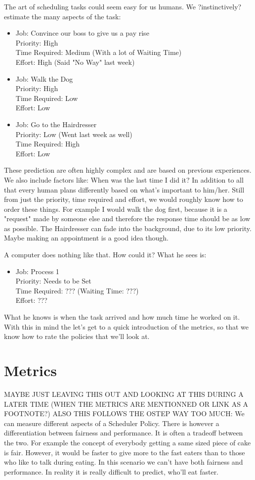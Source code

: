 \documentclass{report}
\begin{document}
The art of scheduling tasks could seem easy for us humans.
We ?instinctively? estimate the many aspects of the task:
\begin{itemize}
\item Job: Convince our boss to give us a pay rise\\Priority: High\\Time Required: Medium (With a lot of Waiting Time)\\Effort: High (Said "No Way" last week)
\item Job: Walk the Dog\\Priority: High\\Time Required: Low\\Effort: Low
\item Job: Go to the Hairdresser\\ Priority: Low (Went last week as well)\\Time Required: High\\Effort: Low
\end{itemize}
These prediction are often highly complex and are based on previous experiences.
We also include factors like: When was the last time I did it?
In addition to all that every human plans differently based on what's important to him/her.
Still from just the priority, time required and effort, we would roughly know how to order these things.
For example I would walk the dog first, because it is a "request" made by someone else and therefore the response time should be as low as possible.
The Hairdresser can fade into the background, due to its low priority. Maybe making an appointment is a good idea though.

A computer does nothing like that. How could it? What he sees is:
\begin{itemize}
\item Job: Process 1\\Priority: Needs to be Set\\Time Required: ??? (Waiting Time: ???)\\Effort: ???
\end{itemize}
What he knows is when the task arrived and how much time he worked on it.
With this in mind the let's get to a quick introduction of the metrics, so that we know how to rate the policies that we'll look at.



\section{Metrics}
MAYBE JUST LEAVING THIS OUT AND LOOKING AT THIS DURING A LATER TIME (WHEN THE METRICS ARE MENTIONNED OR LINK AS A FOOTNOTE?)
ALSO THIS FOLLOWS THE OSTEP WAY TOO MUCH:
We can measure different aspects of a Scheduler Policy. There is however a differentiation between fairness and performance. It is often a tradeoff between the two. For example the concept of everybody getting a same sized piece of cake is fair. However, it would be faster to give more to the fast eaters than to those who like to talk during eating. In this scenario we can't have both fairness and performance. In reality it is really difficult to predict, who'll eat faster.
\end{document}
